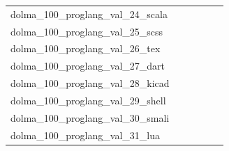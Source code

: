 \documentclass[dvipsnames]{article}
\begin{document}
\begin{appendix}
{\begin{longtable}{m{6cm}m{1.7cm}m{1.7cm}m{1.7cm}m{1.7cm}m{1.7cm}}
	dolma\_100\_proglang\_val\_24\_scala  & \colorbox[HTML]{84cb7d}{\makebox[\mywidth][c]{2.24}} & \colorbox[HTML]{d5eea1}{\makebox[\mywidth][c]{2.28}} & \colorbox[HTML]{ffffe5}{\makebox[\mywidth][c]{2.64}} & \colorbox[HTML]{a5d98b}{\makebox[\mywidth][c]{2.25}} & \colorbox[HTML]{77c578}{\makebox[\mywidth][c]{2.23}}\\
	dolma\_100\_proglang\_val\_25\_scss  & \colorbox[HTML]{e0f2a8}{\makebox[\mywidth][c]{2.26}} & \colorbox[HTML]{f0f9b4}{\makebox[\mywidth][c]{2.27}} & \colorbox[HTML]{ffffe5}{\makebox[\mywidth][c]{2.38}} & \colorbox[HTML]{77c578}{\makebox[\mywidth][c]{2.24}} & \colorbox[HTML]{78c679}{\makebox[\mywidth][c]{2.24}}\\
	dolma\_100\_proglang\_val\_26\_tex  & \colorbox[HTML]{77c578}{\makebox[\mywidth][c]{4.04}} & \colorbox[HTML]{eaf7af}{\makebox[\mywidth][c]{4.21}} & \colorbox[HTML]{ffffe5}{\makebox[\mywidth][c]{4.97}} & \colorbox[HTML]{b3df91}{\makebox[\mywidth][c]{4.10}} & \colorbox[HTML]{7ac779}{\makebox[\mywidth][c]{4.04}}\\
	dolma\_100\_proglang\_val\_27\_dart  & \colorbox[HTML]{b3df91}{\makebox[\mywidth][c]{1.79}} & \colorbox[HTML]{e3f4aa}{\makebox[\mywidth][c]{1.82}} & \colorbox[HTML]{ffffe5}{\makebox[\mywidth][c]{2.01}} & \colorbox[HTML]{bee496}{\makebox[\mywidth][c]{1.80}} & \colorbox[HTML]{77c578}{\makebox[\mywidth][c]{1.78}}\\
	dolma\_100\_proglang\_val\_28\_kicad  & \colorbox[HTML]{77c578}{\makebox[\mywidth][c]{2.57}} & \colorbox[HTML]{e5f4ab}{\makebox[\mywidth][c]{2.79}} & \colorbox[HTML]{ffffe5}{\makebox[\mywidth][c]{3.86}} & \colorbox[HTML]{bee496}{\makebox[\mywidth][c]{2.68}} & \colorbox[HTML]{b8e293}{\makebox[\mywidth][c]{2.67}}\\
	dolma\_100\_proglang\_val\_29\_shell  & \colorbox[HTML]{d0ec9e}{\makebox[\mywidth][c]{3.71}} & \colorbox[HTML]{e2f3a9}{\makebox[\mywidth][c]{3.74}} & \colorbox[HTML]{ffffe5}{\makebox[\mywidth][c]{4.31}} & \colorbox[HTML]{c3e698}{\makebox[\mywidth][c]{3.69}} & \colorbox[HTML]{77c578}{\makebox[\mywidth][c]{3.63}}\\
	dolma\_100\_proglang\_val\_30\_smali  & \colorbox[HTML]{c3e698}{\makebox[\mywidth][c]{1.38}} & \colorbox[HTML]{f8fcbf}{\makebox[\mywidth][c]{1.39}} & \colorbox[HTML]{ffffe5}{\makebox[\mywidth][c]{1.45}} & \colorbox[HTML]{ccea9c}{\makebox[\mywidth][c]{1.38}} & \colorbox[HTML]{77c578}{\makebox[\mywidth][c]{1.37}}\\
	dolma\_100\_proglang\_val\_31\_lua  & \colorbox[HTML]{e6f5ad}{\makebox[\mywidth][c]{5.65}} & \colorbox[HTML]{fbfdd4}{\makebox[\mywidth][c]{6.01}} & \colorbox[HTML]{ffffe5}{\makebox[\mywidth][c]{7.18}} & \colorbox[HTML]{77c578}{\makebox[\mywidth][c]{5.33}} & \colorbox[HTML]{b3df91}{\makebox[\mywidth][c]{5.45}}\\

\end{longtable}}
\end{appendix}
\end{document}
